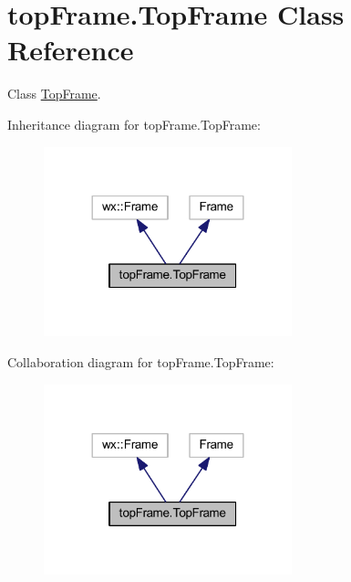 \hypertarget{classtop_frame_1_1_top_frame}{\section{top\-Frame.\-Top\-Frame Class Reference}
\label{classtop_frame_1_1_top_frame}
}


Class \hyperlink{classtop_frame_1_1_top_frame}{Top\-Frame}.  




Inheritance diagram for top\-Frame.\-Top\-Frame\-:\nopagebreak
\begin{figure}[H]
\begin{center}
\leavevmode
\includegraphics[width=204pt]{classtop_frame_1_1_top_frame__inherit__graph}
\end{center}
\end{figure}


Collaboration diagram for top\-Frame.\-Top\-Frame\-:\nopagebreak
\begin{figure}[H]
\begin{center}
\leavevmode
\includegraphics[width=204pt]{classtop_frame_1_1_top_frame__coll__graph}
\end{center}
\end{figure}

